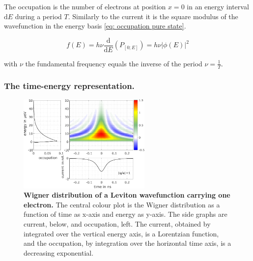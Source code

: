 The occupation is the number of electrons at position $x=0$ in an energy interval $\mathrm{d}E$ during a period $T$.
Similarly to the current it is the square modulus of the wavefunction in the energy basis \eqref{eq: occupation pure state}.

\begin{equation}
f\left(E\right) = h\nu\frac{\mathrm{d}}{\mathrm{d}E}\left(P_{\left[0; E\right]}\right) = h\nu|\phi\left(E\right)|^{2} \label{eq: occupation pure state}
\end{equation}

with $\nu$ the fundamental frequency equals the inverse of the period $\nu = \frac{1}{T}$.

\subsubsection*{The time-energy representation.}

\begin{figure}[hptb]
	\begin{center}
			\includegraphics[width = 6.5cm]{./chap1/leviton_f_200MHz_tau_80ps_1microK_1e}
	\end{center}
	\caption{\textbf{Wigner distribution of a Leviton wavefunction carrying one electron.} The central colour plot is the Wigner distribution as a function of time as x-axis and energy as y-axis. The side graphs are current, below, and occupation, left. The current, obtained by integrated over the vertical energy axis, is a Lorentzian function, and the occupation, by integration over the horizontal time axis, is a decreasing exponential.}
	\label{fig: Wigner Leviton}
\end{figure}


